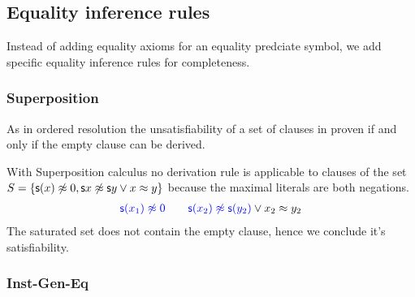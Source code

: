 
\subsection{Equality inference rules}	

Instead of adding equality axioms for an equality predciate symbol, 
we add specific equality inference rules for completeness.


\subsubsection{Superposition}\label{sec:superposition}

As in ordered resolution the unsatisfiability of a set of clauses in proven if and only if the empty clause can be derived.




\begin{example} With Superposition calculus no derivation rule is applicable 
	to clauses of the set $S = \{ {\mathsf s}(x)\not\approx 0, {\mathsf s}{x}\not\approx{\mathsf s}{y} \lor x\approx y  \}$ 
	because the maximal literals are both negations. 
	\begin{align*}
	{\colN \msucc(x_1) \mNE 0}\qquad{\colN \msucc(x_2) \mNE \msucc(y_2)} \lor x_2\mEQ y_2
	\end{align*}
	The saturated set does not contain the empty clause, hence we conclude it's satisfiability.
\end{example}

\subsubsection{Inst-Gen-Eq}\label{sec:inst:gen:eq}

